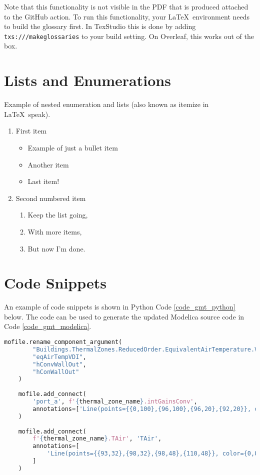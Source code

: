 Note that this functionality is not visible in the PDF that is produced attached to the GitHub action. To run this functionality, your \LaTeX\ environment needs to build the glossary first. In TexStudio this is done by adding \texttt{txs:///makeglossaries} to your build setting. On Overleaf, this works out of the box.

\section{Lists and Enumerations}

Example of nested enumeration and lists (also known as itemize in \LaTeX\ speak).

\begin{enumerate}
	\item First item
	\begin{itemize}
		\item Example of just a bullet item
		\item Another item
		\item Last item!
	\end{itemize}

	\item Second numbered item
	\begin{enumerate}
		\item Keep the list going,
		\item With more items,
		\item But now I'm done.
	\end{enumerate}
\end{enumerate}

\section{Code Snippets}

An example of code snippets is shown in Python Code \ref{code_gmt_python} below. The code can be used to generate the updated Modelica source code in Code \ref{code_gmt_modelica}.

\begin{lstlisting}[language=Python, backgroundcolor=\color{aliceblue}, caption={Python snippets of Modelica Builder commands}, captionpos=b, label={code_gmt_python}]
	mofile.rename_component_argument(
		"Buildings.ThermalZones.ReducedOrder.EquivalentAirTemperature.VDI6007",
		"eqAirTempVDI",
		"hConvWallOut",
		"hConWallOut"
	)
	
	mofile.add_connect(
		'port_a', f'{thermal_zone_name}.intGainsConv',
		annotations=['Line(points={{0,100},{96,100},{96,20},{92,20}}, color={191,0,0})']
	)
	
	mofile.add_connect(
		f'{thermal_zone_name}.TAir', 'TAir',
		annotations=[
			'Line(points={{93,32},{98,32},{98,48},{110,48}}, color={0,0,127})'
		]
	)
\end{lstlisting}

